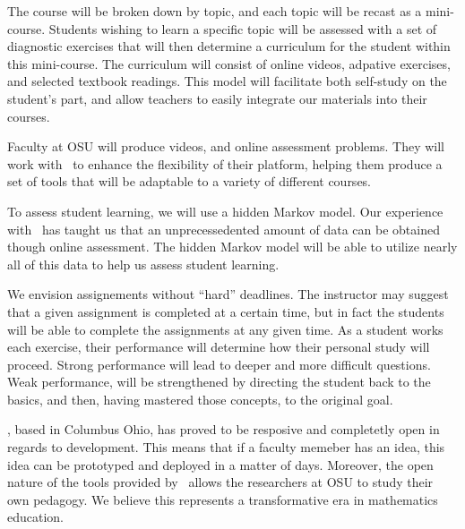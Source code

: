 
The course will be broken down by topic, and each topic will be recast
as a mini-course. Students wishing to learn a specific topic will be
assessed with a set of diagnostic exercises that will then determine a
curriculum for the student within this mini-course. The curriculum
will consist of online videos, adpative exercises, and selected
textbook readings. This model will facilitate both self-study on the
student's part, and allow teachers to easily integrate our materials
into their courses.


Faculty at OSU will produce videos, and online assessment
problems. They will work with \gratisu\ to enhance the flexibility of
their platform, helping them produce a set of tools that will be
adaptable to a variety of different courses.



To assess student learning, we will use a hidden Markov model. Our
experience with \mooculus\ has taught us that an unprecessedented
amount of data can be obtained though online assessment. The hidden
Markov model will be able to utilize nearly all of this data to help
us assess student learning.



We envision assignements without ``hard'' deadlines. The instructor
may suggest that a given assignment is completed at a certain time,
but in fact the students will be able to complete the assignments at
any given time. As a student works each exercise, their performance
will determine how their personal study will proceed. Strong
performance will lead to deeper and more difficult questions. Weak
performance, will be strengthened by directing the student back to the
basics, and then, having mastered those concepts, to the original
goal.



\gratisu, based in Columbus Ohio, has proved to be resposive and
completetly open in regards to development. This means that if a
faculty memeber has an idea, this idea can be prototyped and deployed
in a matter of days. Moreover, the open nature of the tools provided
by \gratisu\ allows the researchers at OSU to study their own pedagogy. We believe this represents a transformative era in mathematics education. 

